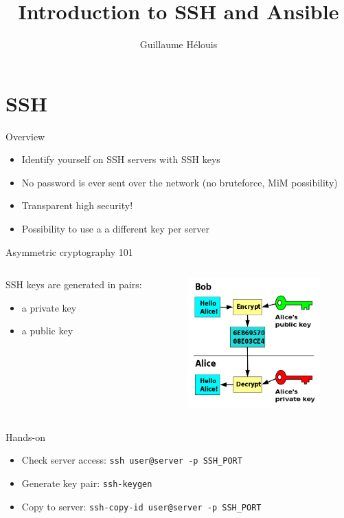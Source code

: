 \documentclass{beamer}
\title{Introduction to SSH and Ansible}
\author{Guillaume Hélouis}
\begin{document}
\begin{frame}
  \titlepage
\end{frame}

\section{SSH}
\begin{frame}{Overview}
  \begin{itemize}
    \item Identify yourself on SSH servers with SSH keys
    \item No password is ever sent over the network (no bruteforce, MiM
      possibility)
    \item Transparent high security!
    \item Possibility to use a a different key per server
  \end{itemize}
\end{frame}

\begin{frame}{Asymmetric cryptography 101}
  \begin{columns}[T]
    \begin{column}[T]{5cm}
      SSH keys are generated in pairs:
      \begin{itemize}
        \item a private key
        \item a public key
      \end{itemize}
    \end{column}
    \begin{column}[T]{5cm}
      \includegraphics[height=5cm]{images/public_key.png}
    \end{column}
  \end{columns}
\end{frame}

\begin{frame}{Hands-on}
  \begin{itemize}
    \item Check server access: {\tt ssh user@server -p SSH\_PORT}
    \item Generate key pair: {\tt ssh-keygen}
    \item Copy to server: {\tt ssh-copy-id user@server -p SSH\_PORT}
  \end{itemize}
\end{frame}
\end{document}
